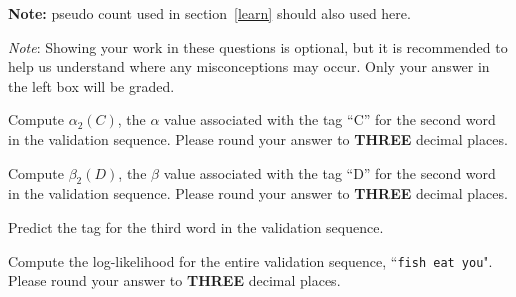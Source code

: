 \documentclass[11pt,addpoints,answers]{exam}
\begin{document}
\begin{questions}
\begin{parts}
\textbf{Note:} pseudo count used in section~\ref{learn} should also used here.

\textit{Note}: Showing your work in these questions is optional, but it is recommended to help us understand where any misconceptions may occur. Only your answer in the left box will be graded.

    
\begin{subparts}
    \subpart[1] Compute $\alpha_2(C)$, the $\alpha$ value associated with the tag ``C'' for the second word in the validation sequence. Please round your answer to \textbf{THREE} decimal places.
    
    \begin{your_solution}[title=$\alpha_2(C)$,height=2cm,width=3cm]
    \end{your_solution}
    \begin{your_solution}[title=Work,height=11cm,width=13cm]
    \end{your_solution}
    
    \clearpage
    \subpart[1] Compute $\beta_2(D)$, the $\beta$ value associated with the tag ``D'' for the second word in the validation sequence. Please round your answer to \textbf{THREE} decimal places.
    
    \begin{your_solution}[title=$\beta_2(D)$,height=2cm,width=3cm]
    \end{your_solution}
    \begin{your_solution}[title=Work,height=5cm,width=12cm]
    \end{your_solution}    
    
    \subpart[1] Predict the tag for the third word in the validation sequence. 
    
    \begin{your_solution}[title=Tag,height=2cm,width=3cm]
    \end{your_solution}
    \begin{your_solution}[title=Work,height=4cm,width=12cm]
    \end{your_solution}  
    
    \subpart[1] Compute the log-likelihood for the entire validation sequence, ``\texttt{fish eat you}". Please round your answer to \textbf{THREE} decimal places.
    
    \begin{your_solution}[title=Log-Likelihood,height=2cm,width=3cm]
    \end{your_solution}
    \begin{your_solution}[title=Work,height=4cm,width=12cm]
    \end{your_solution} 
    

\end{subparts}
\end{parts}
\end{questions}
\end{document}
